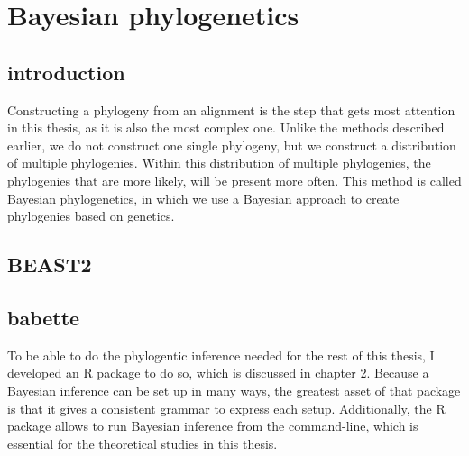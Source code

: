 \section{Bayesian phylogenetics}



\subsection{introduction}

Constructing a phylogeny from an alignment is the step that
gets most attention in this thesis, as it is also the most complex
one. Unlike the methods described earlier, 
we do not construct one single phylogeny, 
but we construct a distribution of multiple phylogenies.
Within this distribution of multiple phylogenies, the phylogenies
that are more likely, will be present more often.
This method is called Bayesian phylogenetics, in which we use
a Bayesian approach to create phylogenies based on genetics.

\subsection{BEAST2}

\subsection{babette}

To be able to do the phylogentic inference needed for the rest of this
thesis, I developed an R package to do so, which
is discussed in chapter 2. Because a Bayesian inference can be set up in
many ways, the greatest asset of that package is that it gives a
consistent grammar to express each setup. Additionally, the R package allows
to run Bayesian inference from the command-line, which is essential for
the theoretical studies in this thesis.

